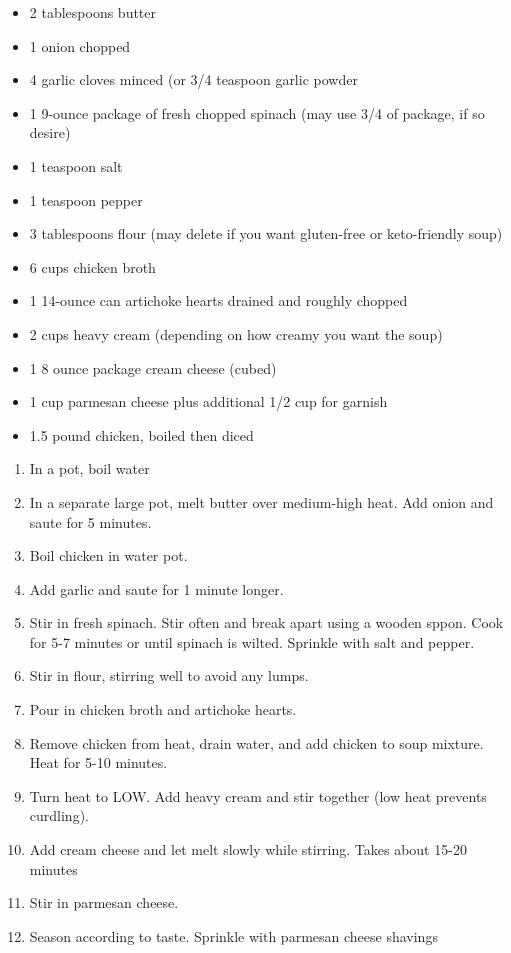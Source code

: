 \documentclass{article}
\begin{document}
\begin{framed}
\begin{itemize}
    \item 2 tablespoons butter
    \item 1 onion chopped
    \item 4 garlic cloves minced (or 3/4 teaspoon garlic powder
    \item 1 9-ounce package of fresh chopped spinach (may use 3/4 of package, if so desire)
    \item 1 teaspoon salt
    \item 1 teaspoon pepper
    \item 3 tablespoons flour (may delete if you want gluten-free or keto-friendly soup)
    \item 6 cups chicken broth
    \item 1 14-ounce can artichoke hearts drained and roughly chopped
    \item 2 cups heavy cream (depending on how creamy you want the soup)
    \item 1 8 ounce package cream cheese (cubed)
    \item 1 cup parmesan cheese plus additional 1/2 cup for garnish
    \item 1.5 pound chicken, boiled then diced
\end{itemize}
\end{framed}

\begin{enumerate}
\item 
In a pot, boil water
\item 
In a separate large pot, melt butter over medium-high heat. Add onion and saute for 5 minutes. 
\item 
Boil chicken in water pot.
\item 
Add garlic and saute for 1 minute longer.
\item 
Stir in fresh spinach. Stir often and break apart using a wooden sppon. Cook for 5-7 minutes or until spinach is wilted. Sprinkle with salt and pepper. 
\item 
Stir in flour, stirring well to avoid any lumps.
\item 
Pour in chicken broth and artichoke hearts.
\item 
Remove chicken from heat, drain water, and add chicken to soup mixture. Heat for 5-10 minutes.
\item 
Turn heat to LOW. Add heavy cream and stir together (low heat prevents curdling).
\item 
Add cream cheese and let melt slowly while stirring. Takes about 15-20 minutes
\item 
Stir in parmesan cheese.
\item 
Season according to taste. Sprinkle with parmesan cheese shavings
\end{enumerate}
\newpage
\end{document}
